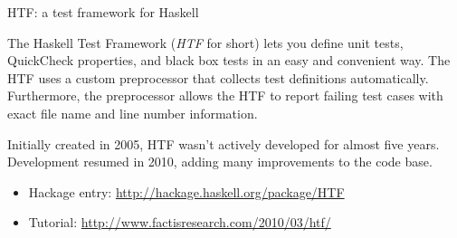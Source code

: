 \documentclass{scrreprt}
\begin{document}
\begin{hcarentry}{HTF: a test framework for Haskell}
\makeheader
\label{htf}

The Haskell Test Framework (\emph{HTF} for short) lets you define unit
tests, QuickCheck properties, and black box tests in an easy and
convenient way. The HTF uses a custom preprocessor that collects test
definitions automatically. Furthermore, the preprocessor allows the HTF to
report failing test cases with exact file name and line number
information.

Initially created in 2005, HTF wasn't actively developed for almost five
years. Development resumed in 2010, adding many improvements to the code
base.

\FurtherReading
\begin{itemize}
\item Hackage entry: \url{http://hackage.haskell.org/package/HTF}
\item Tutorial: \url{http://www.factisresearch.com/2010/03/htf/}
\end{itemize}

\end{hcarentry}
\end{document}
